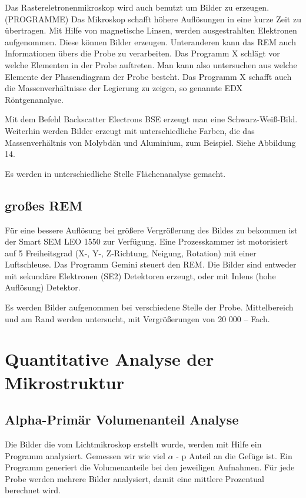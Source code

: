 	Das Rastereletronenmikroskop wird auch benutzt um Bilder zu erzeugen. (PROGRAMME) Das Mikroskop schafft höhere Auflösungen in eine kurze Zeit zu übertragen. Mit Hilfe von magnetische Linsen, werden ausgestrahlten Elektronen aufgenommen.  Diese können Bilder erzeugen. Unteranderen kann das REM auch Informationen übers die Probe zu verarbeiten. Das Programm X schlägt vor welche Elementen in der Probe auftreten. Man kann also untersuchen aus welche Elemente der Phasendiagram der Probe besteht. Das Programm X schafft auch die Massenverhältnisse der Legierung zu zeigen, so genannte EDX Röntgenanalyse.   
	
	Mit dem Befehl Backscatter Electrons BSE erzeugt man eine Schwarz-Weiß-Bild. Weiterhin werden Bilder erzeugt mit unterschiedliche Farben, die das Massenverhältnis von Molybdän und Aluminium, zum Beispiel. Siehe Abbildung 14.
	
	Es werden in unterschiedliche Stelle Flächenanalyse gemacht. 


	\subsection{großes REM}
		
Für eine bessere Auflösung bei größere Vergrößerung des Bildes zu bekommen ist der Smart SEM LEO 1550 zur Verfügung. Eine Prozesskammer ist motorisiert auf 5 Freiheitsgrad (X-, Y-, Z-Richtung, Neigung, Rotation) mit einer Luftschleuse. Das Programm Gemini steuert den REM. Die Bilder sind entweder mit sekundäre Elektronen (SE2) Detektoren erzeugt, oder mit Inlens (hohe Auflösung) Detektor. 

Es werden Bilder aufgenommen bei verschiedene Stelle der Probe. Mittelbereich und am Rand werden untersucht, mit Vergrößerungen von 20 000 – Fach. 



	
\section{Quantitative Analyse der Mikrostruktur}


	\subsection{Alpha-Primär Volumenanteil Analyse}
	
	Die Bilder die vom Lichtmikroskop erstellt wurde, werden mit Hilfe ein Programm analysiert. Gemessen wir wie viel $\alpha$ - p Anteil an die Gefüge ist. Ein Programm generiert die Volumenanteile bei den jeweiligen Aufnahmen. Für jede Probe werden mehrere Bilder analysiert, damit eine mittlere Prozentual berechnet wird. 
	



